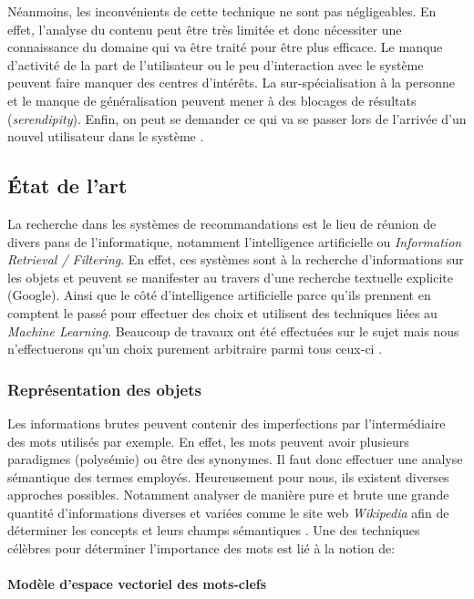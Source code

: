 Néanmoins, les inconvénients de cette technique ne sont pas négligeables. En effet, l'analyse du contenu peut être très limitée et donc nécessiter une connaissance du domaine qui va être traité pour être plus efficace. Le manque d'activité de la part de l'utilisateur ou le peu d'interaction avec le système peuvent faire manquer des centres d'intérêts. La sur-spécialisation à la personne et le manque de généralisation peuvent mener à des blocages de résultats (\textit{serendipity}). Enfin, on peut se demander ce qui va se passer lors de l'arrivée d'un nouvel utilisateur dans le système \cite{Ricci210}.

\subsection{État de l'art}

La recherche dans les systèmes de recommandations est le lieu de réunion de divers pans de l'informatique, notamment l'intelligence artificielle ou \textit{Information Retrieval / Filtering}. En effet, ces systèmes sont à la recherche d'informations sur les objets et peuvent se manifester au travers d'une recherche textuelle explicite (Google). Ainsi que le côté d'intelligence artificielle parce qu'ils prennent en comptent le passé pour effectuer des choix et utilisent des techniques liées au \textit{Machine Learning}. Beaucoup de travaux ont été effectuées sur le sujet mais nous n'effectuerons qu'un choix purement arbitraire parmi tous ceux-ci \cite{pazzani2007content}.

\subsubsection{Représentation des objets}

Les informations brutes peuvent contenir des imperfections par l'intermédiaire des mots utilisés par exemple. En effet, les mots peuvent avoir plusieurs paradigmes (polysémie) ou être des synonymes. Il faut donc effectuer une analyse sémantique des termes employés. Heureusement pour nous, ils existent diverses approches possibles. Notamment analyser de manière pure et brute une grande quantité d'informations diverses et variées comme le site web \textit{Wikipedia} afin de déterminer les concepts et leurs champs sémantiques \cite{breese1998empirical}. Une des techniques célèbres pour déterminer l'importance des mots est lié à la notion de:

\paragraph{Modèle d'espace vectoriel des mots-clefs}

